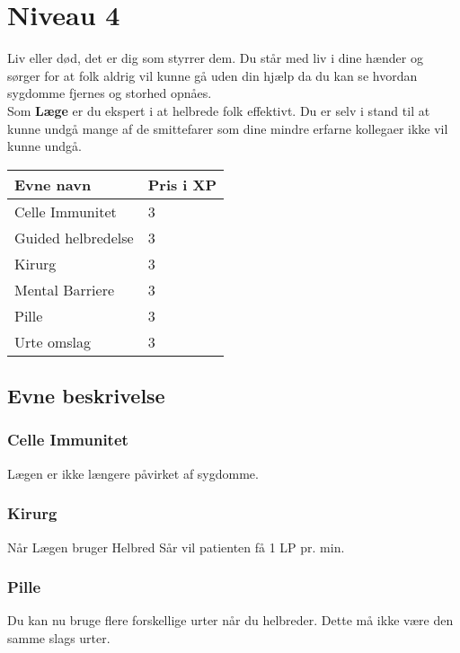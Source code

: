 \chapter{Niveau 4}
Liv eller død, det er dig som styrrer dem. Du står med liv i dine hænder og sørger for at folk aldrig vil kunne gå uden din hjælp da du kan se hvordan sygdomme fjernes og storhed opnåes.\\
Som \textbf{Læge} er du ekspert i at helbrede folk effektivt. Du er selv i stand til at kunne undgå mange af de smittefarer som dine mindre erfarne kollegaer ikke vil kunne undgå.\\ 


\begin{table}[H]
    \centering
    \begin{tabular}{|p{}|p{}|}
    \rowcolor{cerulean!80}\hline
        Evne navn & Pris i XP \\\hline
        Celle Immunitet & 3\\\hline
        Guided helbredelse & 3\\\hline
        Kirurg & 3 \\\hline
        Mental Barriere & 3\\\hline
        Pille & 3 \\\hline
        Urte omslag & 3 \\\hline
    \end{tabular}
\end{table}
\section{Evne beskrivelse}

\subsection{Celle Immunitet}
Lægen er ikke længere påvirket af sygdomme.

\subsection{Kirurg}
Når Lægen bruger Helbred Sår vil patienten få 1 LP pr. min.

\subsection{Pille}
Du kan nu bruge flere forskellige urter når du helbreder. Dette må ikke være den samme slags urter.

